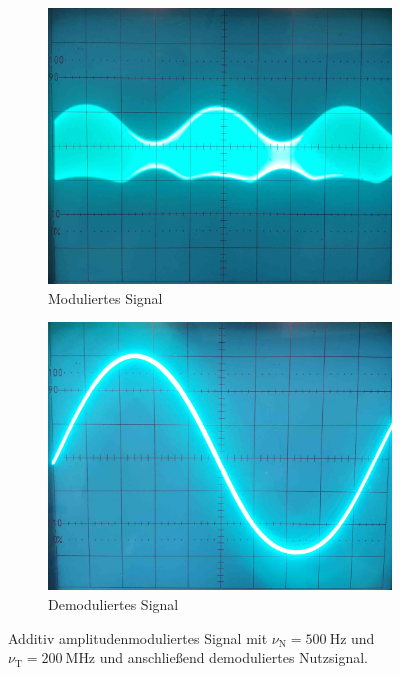 \documentclass[a4paper,twoside,final]{article}
\begin{document}
\begin{figure}[htp]
    \centering
    \begin{subfigure}{0.45\textwidth}
        \includegraphics[width=\textwidth]{Bilder/AM_500Hz_200MHz.jpg}
        \caption{Moduliertes Signal}
    \end{subfigure}\hspace{1cm}
    \begin{subfigure}{0.45\textwidth}
        \includegraphics[width=\textwidth]{Bilder/AM_500Hz_demoduliert.jpg}
        \caption{Demoduliertes Signal}
    \end{subfigure}
    \caption{Additiv amplitudenmoduliertes Signal mit $\nu_\text{N} = \SI{500}{\hertz}$ und $\nu_\text{T} = \SI{200}{\mega\hertz}$ und anschließend demoduliertes Nutzsignal.}
    \label{fig:Demodulation}
\end{figure}\\
\end{document}
